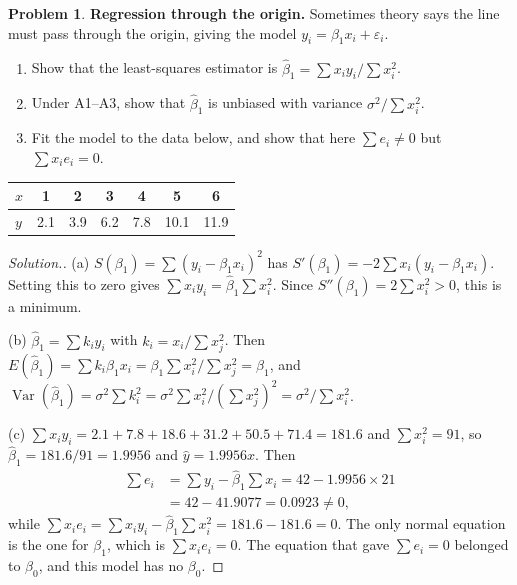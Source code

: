\documentclass[11pt,a4paper]{article}
\numberwithin{equation}{section}
\theoremstyle{definition}
\newtheorem{problemx}{Problem}[subsection]
\newenvironment{problem}{\begin{problemx}}{\end{problemx}}
\newenvironment{solution}
  {\renewcommand{\qedsymbol}{}\begin{proof}[\textit{Solution}.]}
  {\end{proof}}
\begin{document}
\begin{problem}\label{prob:origin}
\textbf{Regression through the origin.} Sometimes theory says the line must pass through the origin, giving the model
$y_i = \beta_1 x_i + \varepsilon_i$.
\begin{enumerate}[label=(\alph*)]
\item Show that the least-squares estimator is $\hat\beta_1 = \sum x_i y_i \big/ \sum x_i^2$.
\item Under A1--A3, show that $\hat\beta_1$ is unbiased with variance $\sigma^2 \big/ \sum x_i^2$.
\item Fit the model to the data below, and show that here $\sum e_i \neq 0$ but $\sum x_i e_i = 0$.
\end{enumerate}
\begin{center}
\begin{tabular}{l|cccccc}
$x$ & 1 & 2 & 3 & 4 & 5 & 6 \\
\hline
$y$ & 2.1 & 3.9 & 6.2 & 7.8 & 10.1 & 11.9 \\
\end{tabular}
\end{center}
\end{problem}

\begin{solution}
(a) $S(\beta_1) = \sum (y_i - \beta_1 x_i)^2$ has
$S'(\beta_1) = -2\sum x_i (y_i - \beta_1 x_i)$. Setting this to zero gives
$\sum x_i y_i = \hat\beta_1 \sum x_i^2$. Since $S''(\beta_1) = 2\sum x_i^2 > 0$, this is a
minimum.

(b) $\hat\beta_1 = \sum k_i y_i$ with $k_i = x_i / \sum x_j^2$. Then
$E(\hat\beta_1) = \sum k_i \beta_1 x_i = \beta_1 \sum x_i^2 / \sum x_j^2 = \beta_1$, and
$\operatorname{Var}(\hat\beta_1) = \sigma^2 \sum k_i^2 = \sigma^2 \sum x_i^2 / \left(\sum x_j^2\right)^2 = \sigma^2 / \sum x_i^2$.

(c) $\sum x_i y_i = 2.1 + 7.8 + 18.6 + 31.2 + 50.5 + 71.4 = 181.6$ and $\sum x_i^2 = 91$, so
$\hat\beta_1 = 181.6/91 = 1.9956$ and $\hat y = 1.9956x$. Then
\begin{align*}
\sum e_i &= \sum y_i - \hat\beta_1 \sum x_i = 42 - 1.9956 \times 21 \\
         &= 42 - 41.9077 = 0.0923 \neq 0 ,
\end{align*}
while $\sum x_i e_i = \sum x_i y_i - \hat\beta_1 \sum x_i^2 = 181.6 - 181.6 = 0$.
The only normal equation is the one for $\beta_1$, which is $\sum x_i e_i = 0$. The equation
that gave $\sum e_i = 0$ belonged to $\beta_0$, and this model has no $\beta_0$.
\end{solution}
\end{document}
